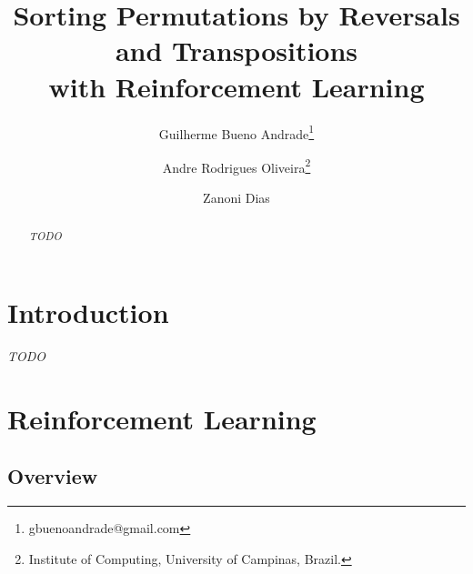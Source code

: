 \documentclass[11pt,twoside]{article}
\begin{document}


%



\TRMakeCover

\pagestyle{myheadings}

\title{Sorting Permutations by Reversals and Transpositions\\ with Reinforcement Learning}

\newcommand*\samethanks[1][\value{footnote}]{\footnotemark[#1]}
\author{Guilherme Bueno Andrade\thanks{gbuenoandrade@gmail.com} \and
Andre Rodrigues Oliveira\thanks{Institute of Computing, University of Campinas, Brazil.} \and Zanoni Dias\samethanks}

\date{}

\maketitle


\begin{abstract} 
\textit{TODO}
\end{abstract}

\section{Introduction}
\label{sec:intro}

\textit{TODO}

\section{Reinforcement Learning}


\subsection{Overview}
\end{document}
